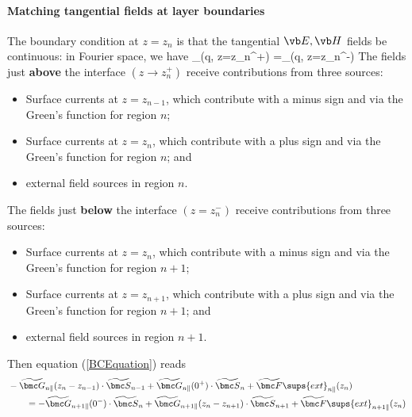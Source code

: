 \documentclass[letterpaper]{article}
\renewcommand{\wt}{\widetilde}
\begin{document}
\paragraph{Matching tangential fields at layer boundaries}

The boundary condition at $z=z_n$ is that the tangential $\vb E, \vb H$
fields be continuous: in Fourier space, we have
{ \wt{\bmc F}_{\parallel}(\vb q, z=z_n^+)
 =\wt{\bmc F}_{\parallel}(\vb q, z=z_n^-)
}
The fields just \textbf{above} the interface $(z\to z_n^+)$ receive
contributions from three sources:
\begin{itemize}
 \item Surface currents at $z=z_{n-1}$, which contribute with
       a minus sign and via the Green's function for region $n$;
 \item Surface currents at $z=z_{n}$, which contribute with
       a plus sign and via the Green's function for region $n$; and
 \item external field sources in region $n$.
\end{itemize}
The fields just \textbf{below} the interface $(z=z_n^-)$ receive
contributions from three sources:
\begin{itemize}
 \item Surface currents at $z=z_{n}$, which contribute with
       a minus sign and via the Green's function for region $n+1$;
 \item Surface currents at $z=z_{n+1}$, which contribute with
       a plus sign and via the Green's function for region $n+1$; and
 \item external field sources in region $n+1$.
\end{itemize}
Then equation (\ref{BCEquation}) reads
\begin{align*}
&
-\wt{\bmc G}_{n\parallel}(z_n-z_{n-1})\cdot \wt{\bmc S}_{n-1}
+\wt{\bmc G}_{n\parallel}(0^+) \cdot \wt{\bmc S}_{n}
+\wt{\bmc F}\sups{ext}_{n\parallel}(z_n)
\\
&\qquad=
-\wt{\bmc G}_{n+1\parallel}(0^-) \cdot \wt{\bmc S}_{n}
+\wt{\bmc G}_{n+1\parallel}(z_n-z_{n+1})\cdot \wt{\bmc S}_{n+1}
+\wt{\bmc F}\sups{ext}_{n+1\parallel}(z_n)
\end{align*}
\end{document}

